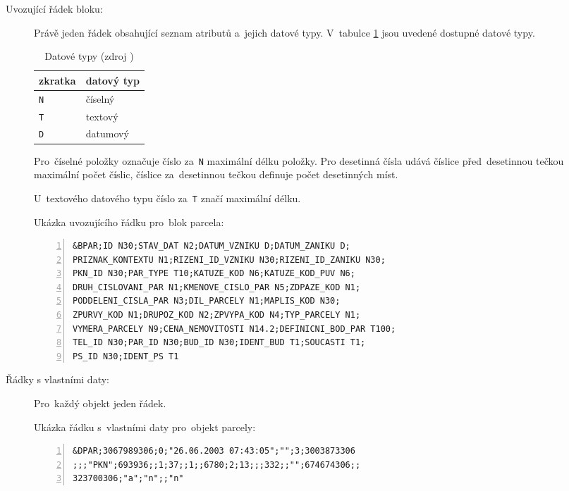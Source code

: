 \begin{description}	
	\item[Uvozující řádek bloku:] Právě jeden řádek obsahující seznam atributů a~jejich datové typy. V~tabulce \ref{tab:datove_typy} jsou uvedené dostupné datové typy.

\begin{table}[H]
    \begin{tabular}{|l|l|}
        \hline
         zkratka & datový typ \\
        \hline
        \hline
         \texttt{N} & číselný \\ \hline
         \texttt{T} & textový \\ \hline
         \texttt{D} & datumový \\
         \hline
    \end{tabular}
    \centering
    \caption[Datové typy]{Datové typy (zdroj \citep{struktura_vfk})}
    \label{tab:datove_typy}
\end{table}

Pro~číselné položky označuje číslo za~\texttt{N} maximální délku položky. Pro desetinná čísla udává číslice před~desetinnou tečkou maximální počet číslic, číslice za~desetinnou tečkou definuje počet desetinných míst.

U~textového datového typu číslo za~\texttt{T} značí maximální délku.

Ukázka uvozujícího řádku pro~blok parcela:

	\begin{lstlisting}[basicstyle=\footnotesize\ttfamily, backgroundcolor = \color{light-gray},  numbers=left]
&BPAR;ID N30;STAV_DAT N2;DATUM_VZNIKU D;DATUM_ZANIKU D;
PRIZNAK_KONTEXTU N1;RIZENI_ID_VZNIKU N30;RIZENI_ID_ZANIKU N30;
PKN_ID N30;PAR_TYPE T10;KATUZE_KOD N6;KATUZE_KOD_PUV N6;
DRUH_CISLOVANI_PAR N1;KMENOVE_CISLO_PAR N5;ZDPAZE_KOD N1;
PODDELENI_CISLA_PAR N3;DIL_PARCELY N1;MAPLIS_KOD N30;
ZPURVY_KOD N1;DRUPOZ_KOD N2;ZPVYPA_KOD N4;TYP_PARCELY N1;
VYMERA_PARCELY N9;CENA_NEMOVITOSTI N14.2;DEFINICNI_BOD_PAR T100;
TEL_ID N30;PAR_ID N30;BUD_ID N30;IDENT_BUD T1;SOUCASTI T1;
PS_ID N30;IDENT_PS T1
	\end{lstlisting}

	\item[Řádky s vlastními daty:] Pro~každý objekt jeden řádek.

Ukázka řádku s~vlastními daty pro~objekt parcely:
	
	\begin{lstlisting}[basicstyle=\footnotesize\ttfamily, backgroundcolor = \color{light-gray},  numbers=left]
&DPAR;3067989306;0;"26.06.2003 07:43:05";"";3;3003873306
;;;"PKN";693936;;1;37;;1;;6780;2;13;;;332;;"";674674306;;
323700306;"a";"n";;"n"
	\end{lstlisting}
\end{description}

